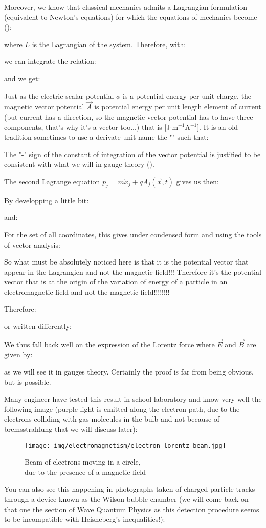 	Moreover, we know that classical mechanics admits a Lagrangian formulation (equivalent to Newton's equations) for which the equations of mechanics become ():
	
	where $L$ is the Lagrangian of the system. Therefore, with:
	
	we can integrate the relation:
	
	and we get:
	
	 Just as the electric scalar potential $\phi$ is a potential energy per unit charge, the magnetic vector potential $\vec{A}$ is potential energy per unit length element of current (but current has a direction, so the magnetic vector potential has to have three components, that's why it's a vector too...) that is [J$\cdot$m$^{-1}$A$^{-1}$]. It is an old tradition sometimes to use a derivate unit name the "" such that:
	 
	The "-" sign of the constant of integration of the vector potential is justified to be consistent with what we will in gauge theory ().

	The second Lagrange equation $p_j=m\dot{x}_j+qA_j(\vec{x},t)$ gives us then:
	
	By developping a little bit:
	
	and:
	
	For the set of all coordinates, this gives under condensed form and using the tools of vector analysis:
	
	So what must be absolutely noticed here is that it is the potential vector that appear in the Lagrangien and not the magnetic field!!! Therefore it's the potential vector that is at the origin of the variation of energy of a particle in an electromagnetic field and not the magnetic field!!!!!!!!
	
	Therefore:
	
	or written differently:
	
	We thus fall back well on the expression of the Lorentz force where $\vec{E}$ and $\vec{B}$ are given by:
	
	as we will see it in gauges theory. Certainly the proof is far from being obvious, but is possible.
	
	Many engineer have tested this result in school laboratory and know very well the following image (purple light is emitted along the electron path, due to the electrons colliding with gas molecules in the bulb and not because of bremsstrahlung that we will discuss later):
	\begin{figure}[H]
		\centering
		\texttt{[image: img/electromagnetism/electron\_lorentz\_beam.jpg]}
		\caption{Beam of electrons moving in a circle,\\ due to the presence of a magnetic field}
	\end{figure}
	You can also see this happening in photographs taken of charged particle tracks through a device known as the Wilson bubble chamber (we will come back on that one the section of Wave Quantum Physics as this detection procedure seems to be incompatible with Heisneberg's inequalities!): 
	
